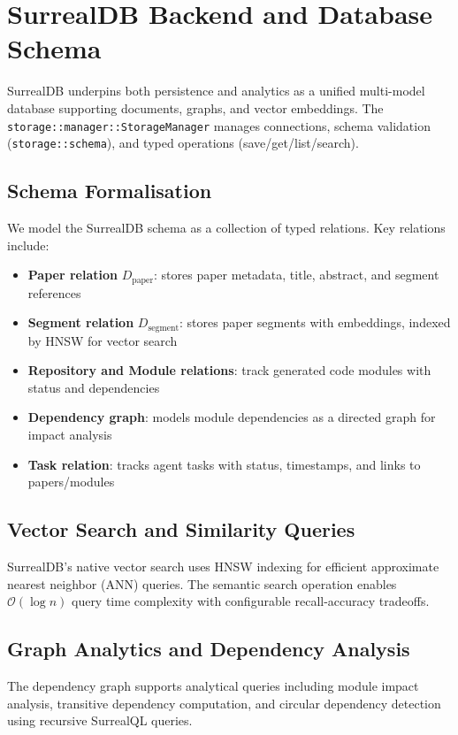\documentclass{ieeeaccess}
\begin{document}
\section{SurrealDB Backend and Database Schema}
SurrealDB underpins both persistence and analytics as a unified multi-model database supporting documents, graphs, and vector embeddings. The \texttt{storage::manager::StorageManager} manages connections, schema validation (\texttt{storage::schema}), and typed operations (save/get/list/search).

\subsection{Schema Formalisation}
We model the SurrealDB schema as a collection of typed relations. Key relations include:
\begin{itemize}
\item \textbf{Paper relation} \(D_{\text{paper}}\): stores paper metadata, title, abstract, and segment references
\item \textbf{Segment relation} \(D_{\text{segment}}\): stores paper segments with embeddings, indexed by HNSW for vector search
\item \textbf{Repository and Module relations}: track generated code modules with status and dependencies
\item \textbf{Dependency graph}: models module dependencies as a directed graph for impact analysis
\item \textbf{Task relation}: tracks agent tasks with status, timestamps, and links to papers/modules
\end{itemize}

\subsection{Vector Search and Similarity Queries}
SurrealDB's native vector search uses HNSW indexing for efficient approximate nearest neighbor (ANN) queries. The semantic search operation enables \(\mathcal{O}(\log n)\) query time complexity with configurable recall-accuracy tradeoffs.

\subsection{Graph Analytics and Dependency Analysis}
The dependency graph supports analytical queries including module impact analysis, transitive dependency computation, and circular dependency detection using recursive SurrealQL queries.
\end{document}
